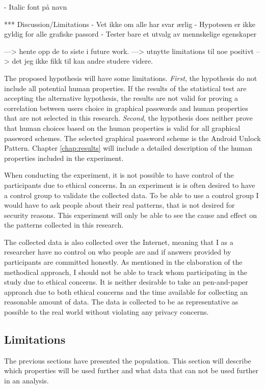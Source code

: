 - Italic font på navn


*** Discussion/Limitations
- Vet ikke om alle har svar ærlig
- Hypotesen er ikke gyldig for alle grafiske passord
- Tester bare et utvalg av mennskelige egenskaper

---> hente opp de to siste i future work.
---> utnytte limitations til noe positivt --> det jeg ikke fikk til kan andre studere videre.

The proposed hypothesis will have some limitations. {\it First}, the hypothesis do not include all potential human properties. If the results of the statistical test are accepting the alternative hypothesis, the results are not valid for proving a correlation between users choice in graphical passwords and human properties that are not selected in this research. {\it Second}, the hypothesis does neither prove that human choices based on the human properties is valid for all graphical password schemes. The selected graphical password scheme is the Android Unlock Pattern. Chapter \ref{chap:results} will include a detailed description of the human properties included in the experiment.

When conducting the experiment, it is not possible to have control of the participants due to ethical concerns. In an experiment is is often desired to have a control group to validate the collected data. To be able to use a control group I would have to ask people about their real patterns, that is not desired for security reasons. This experiment will only be able to see the cause and effect on the patterns collected in this research.

The collected data is also collected over the Internet, meaning that I as a researcher have no control on who people are and if answers provided by participants are committed honestly. As mentioned in the elaboration of the methodical approach, I should not be able to track whom participating in the study due to ethical concerns. It is neither desirable to take an pen-and-paper approach due to both ethical concerns and the time available for collecting an reasonable amount of data. The data is collected to be as representative as possible to the real world without violating any privacy concerns. 

\subsection{Limitations}

    The previous sections have presented the population. This section will describe which properties will be used further and what data that can not be used further in an analysis. 

